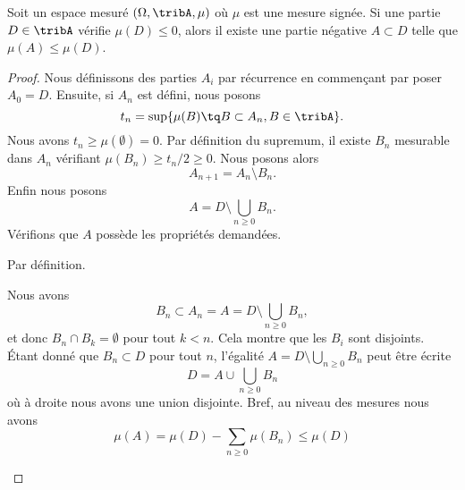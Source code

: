 \begin{proposition}		\label{PROPooBLNXooRRxxVv}
	Soit un espace mesuré \( (\Omega,\tribA,\mu)\) où \( \mu\) est une mesure signée. Si une partie \( D\in \tribA\) vérifie \( \mu(D)\leq 0\), alors il existe une partie négative \( A\subset D\) telle que \( \mu(A)\leq \mu(D)\).
\end{proposition}

\begin{proof}
	Nous définissons des parties \( A_i\) par récurrence en commençant par poser \( A_0=D\). Ensuite, si \( A_n\) est défini, nous posons
	\begin{equation}
		t_n=\sup\{ \mu(B)\tq B\subset A_n, B\in\tribA \}.
	\end{equation}
	Nous avons \( t_n\geq \mu(\emptyset)=0\). Par définition du supremum, il existe \( B_n\) mesurable dans \( A_n\) vérifiant \( \mu(B_n)\geq t_n/2\geq 0\). Nous posons alors
	\begin{equation}
		A_{n+1}=A_n\setminus B_n.
	\end{equation}
	Enfin nous posons
	\begin{equation}
		A=D\setminus \bigcup_{n\geq 0}B_n.
	\end{equation}
	Vérifions que \( A\) possède les propriétés demandées.
	\begin{subproof}
		\spitem[\( A\subset D\)]
		Par définition.
		\spitem[\( \mu(A)\leq \mu(D)\)]
		\begin{subproof}
			Nous avons
			\begin{equation}
				B_n\subset A_n= A=D\setminus \bigcup_{n\geq 0}B_n,
			\end{equation}
			et donc \( B_n\cap B_k=\emptyset\) pour tout \( k<n\). Cela montre que les \( B_i\) sont disjoints.
			\spitem[\( \mu(A)\leq \mu(D)\)]
			Étant donné que \( B_n\subset D\) pour tout \( n\), l'égalité \( A=D\setminus \bigcup_{n\geq 0} B_n\) peut être écrite
			\begin{equation}
				D=A\cup\bigcup_{n\geq 0}B_n
			\end{equation}
			où à droite nous avons une union disjointe. Bref, au niveau des mesures nous avons
			\begin{equation}
				\mu(A)=\mu(D)-\sum_{n\geq 0}\mu(B_n)\leq \mu(D)

\end{equation}
\end{subproof}
\end{subproof}
\end{proof}
